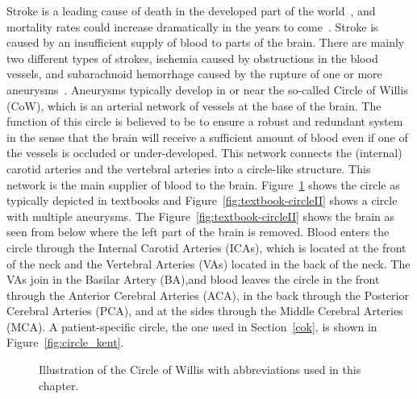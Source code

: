 Stroke is a leading cause of death in the developed part of the
world~\cite{Feigin2005}, and mortality rates could increase dramatically
in the years to come~\cite{MurrayLopez1997}. Stroke is caused by an
insufficient supply of blood to parts of the brain. There are mainly
two different types of strokes, ischemia caused by obstructions in the
blood vessels, and subarachnoid hemorrhage caused by the rupture of
one or more aneurysms~\cite{Humphrey2001}. Aneurysms typically develop in
or near the so-called Circle of Willis (CoW), which is an arterial
network of vessels at the base of the brain. The function of this
circle is believed to be to ensure a robust and redundant system in
the sense that the brain will receive a sufficient amount of blood
even if one of the vessels is occluded or under-developed. This
network connects the (internal) carotid arteries and the vertebral
arteries into a circle-like structure. This network is the main
supplier of blood to the brain. Figure~\ref{fig:textbook-circle} shows
the circle as typically depicted in textbooks and
Figure~\ref{fig:textbook-circleII} shows a circle with multiple
aneurysms. The Figure~\ref{fig:textbook-circleII} shows the brain as
seen from below where the left part of the brain is removed. Blood
enters the circle through the Internal Carotid Arteries (ICAs), which
is located at the front of the neck and the Vertebral Arteries (VAs)
located in the back of the neck.  The VAs join in the Basilar Artery
(BA),and blood leaves the circle in the front through the Anterior
Cerebral Arteries (ACA), in the back through the Posterior Cerebral
Arteries (PCA), and at the sides through the Middle Cerebral Arteries
(MCA). A patient-specific circle, the one used in Section~\ref{cok},
is shown in Figure~\ref{fig:circle_kent}.

\begin{figure}
  \begin{center}
  \end{center}
  \caption{Illustration of the Circle of Willis with abbreviations used in this chapter.}
  \label{fig:textbook-circle}
\end{figure}

